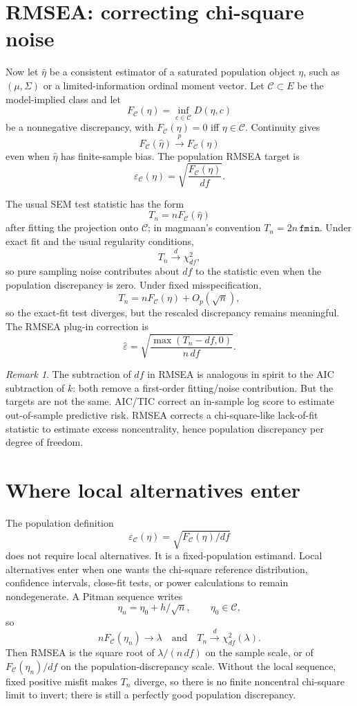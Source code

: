 \documentclass[11pt]{article}
\newcommand{\dto}{\xrightarrow{d}}
\newcommand{\pto}{\xrightarrow{p}}
\theoremstyle{plain}
\theoremstyle{remark}
\newtheorem*{remark}{Remark}
\begin{document}
\section{RMSEA: correcting chi-square noise}

Now let $\hat\eta$ be a consistent estimator of a saturated population object
$\eta$, such as $(\mu,\Sigma)$ or a limited-information ordinal moment vector.
Let $\mathcal C\subset E$ be the model-implied class and let
\[
  F_{\mathcal C}(\eta)
  =
  \inf_{c\in\mathcal C} D(\eta,c)
\]
be a nonnegative discrepancy, with $F_{\mathcal C}(\eta)=0$ iff
$\eta\in\mathcal C$. Continuity gives
\[
  F_{\mathcal C}(\hat\eta)\pto F_{\mathcal C}(\eta)
\]
even when $\hat\eta$ has finite-sample bias. The population RMSEA target is
\[
  \varepsilon_{\mathcal C}(\eta)
  =
  \sqrt{\frac{F_{\mathcal C}(\eta)}{df}}.
\]

The usual SEM test statistic has the form
\[
  T_n = n F_{\mathcal C}(\hat\eta)
\]
after fitting the projection onto $\mathcal C$; in magmaan's convention
$T_n=2n\,\texttt{fmin}$. Under exact fit and the usual regularity conditions,
\[
  T_n \dto \chi^2_{df},
\]
so pure sampling noise contributes about $df$ to the statistic even when the
population discrepancy is zero. Under fixed misspecification,
\[
  T_n = nF_{\mathcal C}(\eta)+O_p(\sqrt n),
\]
so the exact-fit test diverges, but the rescaled discrepancy remains meaningful.
The RMSEA plug-in correction is
\[
  \widehat\varepsilon
  =
  \sqrt{
    \frac{\max(T_n-df,0)}{n\,df}
  }.
\]

\begin{remark}
The subtraction of $df$ in RMSEA is analogous in spirit to the AIC subtraction
of $k$: both remove a first-order fitting/noise contribution. But the targets
are not the same. AIC/TIC correct an in-sample log score to estimate
out-of-sample predictive risk. RMSEA corrects a chi-square-like lack-of-fit
statistic to estimate excess noncentrality, hence population discrepancy per
degree of freedom.
\end{remark}

\section{Where local alternatives enter}

The population definition
\[
  \varepsilon_{\mathcal C}(\eta)=\sqrt{F_{\mathcal C}(\eta)/df}
\]
does not require local alternatives. It is a fixed-population estimand. Local
alternatives enter when one wants the chi-square reference distribution,
confidence intervals, close-fit tests, or power calculations to remain
nondegenerate. A Pitman sequence writes
\[
  \eta_n=\eta_0+h/\sqrt n,\qquad \eta_0\in\mathcal C,
\]
so
\[
  nF_{\mathcal C}(\eta_n)\to\lambda
  \quad\text{and}\quad
  T_n\dto\chi^2_{df}(\lambda).
\]
Then RMSEA is the square root of $\lambda/(n\,df)$ on the sample scale, or of
$F_{\mathcal C}(\eta_n)/df$ on the population-discrepancy scale. Without the
local sequence, fixed positive misfit makes $T_n$ diverge, so there is no
finite noncentral chi-square limit to invert; there is still a perfectly good
population discrepancy.
\end{document}

